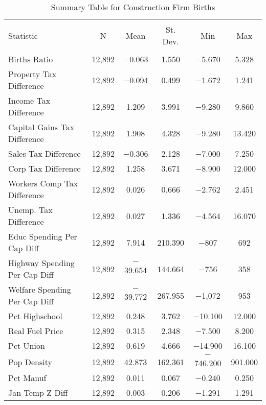 
\begin{table}[!htbp] \centering 
  \caption{Summary Table for  Construction Firm Births} 
  \label{23summary} 
\begin{tabular}{@{\extracolsep{5pt}}lccccc} 
\\[-1.8ex]\hline 
\hline \\[-1.8ex] 
Statistic & \multicolumn{1}{c}{N} & \multicolumn{1}{c}{Mean} & \multicolumn{1}{c}{St. Dev.} & \multicolumn{1}{c}{Min} & \multicolumn{1}{c}{Max} \\ 
\hline \\[-1.8ex] 
Births Ratio & 12,892 & $-$0.063 & 1.550 & $-$5.670 & 5.328 \\ 
Property Tax Difference & 12,892 & $-$0.094 & 0.499 & $-$1.672 & 1.241 \\ 
Income Tax Difference & 12,892 & 1.209 & 3.991 & $-$9.280 & 9.860 \\ 
Capital Gains Tax Difference & 12,892 & 1.908 & 4.328 & $-$9.280 & 13.420 \\ 
Sales Tax Difference & 12,892 & $-$0.306 & 2.128 & $-$7.000 & 7.250 \\ 
Corp Tax Difference & 12,892 & 1.258 & 3.671 & $-$8.900 & 12.000 \\ 
Workers Comp Tax Difference & 12,892 & 0.026 & 0.666 & $-$2.762 & 2.451 \\ 
Unemp. Tax Difference & 12,892 & 0.027 & 1.336 & $-$4.564 & 16.070 \\ 
Educ Spending Per Cap Diff & 12,892 & 7.914 & 210.390 & $-$807 & 692 \\ 
Highway Spending Per Cap Diff & 12,892 & $-$39.654 & 144.664 & $-$756 & 358 \\ 
Welfare Spending Per Cap Diff & 12,892 & $-$39.772 & 267.955 & $-$1,072 & 953 \\ 
Pct Highschool & 12,892 & 0.248 & 3.762 & $-$10.100 & 12.000 \\ 
Real Fuel Price & 12,892 & 0.315 & 2.348 & $-$7.500 & 8.200 \\ 
Pct Union & 12,892 & 0.619 & 4.666 & $-$14.900 & 16.100 \\ 
Pop Density & 12,892 & 42.873 & 162.361 & $-$746.200 & 901.000 \\ 
Pct Manuf & 12,892 & 0.011 & 0.067 & $-$0.240 & 0.250 \\ 
Jan Temp Z Diff & 12,892 & 0.003 & 0.206 & $-$1.291 & 1.291 \\ 

\end{tabular}
\end{table}
